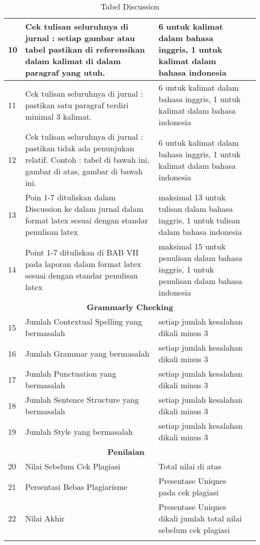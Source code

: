 \begin{longtable}{|p{}|p{}|p{}|p{}|}
10 &Cek tulisan seluruhnya di jurnal : setiap gambar atau tabel pastikan di referensikan dalam kalimat di dalam paragraf yang utuh.& 6 untuk kalimat dalam bahasa inggris, 1 untuk kalimat dalam bahasa indonesia & \\ \hline

11 &Cek tulisan seluruhnya di jurnal : pastikan satu paragraf terdiri minimal 3 kalimat. & 6 untuk kalimat dalam bahasa inggris, 1 untuk kalimat dalam bahasa indonesia& \\ \hline

12 &Cek tulisan seluruhnya di jurnal : pastikan tidak ada penunjukan relatif. Contoh : tabel di bawah ini, gambar di atas, gambar di bawah ini. & 6 untuk kalimat dalam bahasa inggris, 1 untuk kalimat dalam bahasa indonesia&  \\ \hline

13 &Poin 1-7 dituliskan dalam Discussion ke dalam jurnal dalam format latex sesuai dengan standar penulisan latex & maksimal 13 untuk tulisan dalam bahasa inggris, 1 untuk tulisan dalam bahasa indonesia & \\ \hline

14 &Point 1-7 dituliskan di BAB VII pada laporan dalam format latex sesuai dengan standar penulisan latex & maksimal 15 untuk penulisan dalam bahasa inggris, 1 untuk penulisan dalam bahasa indonesia & \\ \hline


\multicolumn{4}{c}{\textbf{Grammarly Checking}}\\ \hline

15 &Jumlah Contextual Spelling yang bermasalah&setiap jumlah kesalahan dikali minus 3& \\ \hline

16 &Jumlah Grammar yang bermasalah&setiap jumlah kesalahan dikali minus 3& \\ \hline

17 &Jumlah Punctuation yang bermasalah&setiap jumlah kesalahan dikali minus 3& \\ \hline

18 &Jumlah Sentence Structure yang bermasalah&setiap jumlah kesalahan dikali minus 3& \\ \hline

19 &Jumlah Style yang bermasalah&setiap jumlah kesalahan dikali minus 3& \\ \hline

\multicolumn{3}{c}{\textbf{Penilaian}}\\ \hline

20 &Nilai Sebelum Cek Plagiasi&Total nilai di atas& \\ \hline

21 &Persentasi Bebas Plagiarisme&Presentase Uniqnes pada cek plagiasi& \\ \hline

22 &Nilai Akhir&Presentase Uniqnes dikali jumlah total nilai sebelum cek plagiasi& \\ \hline

\caption{Tabel Discussion}
\label{table:Discussion}
\end{longtable}

